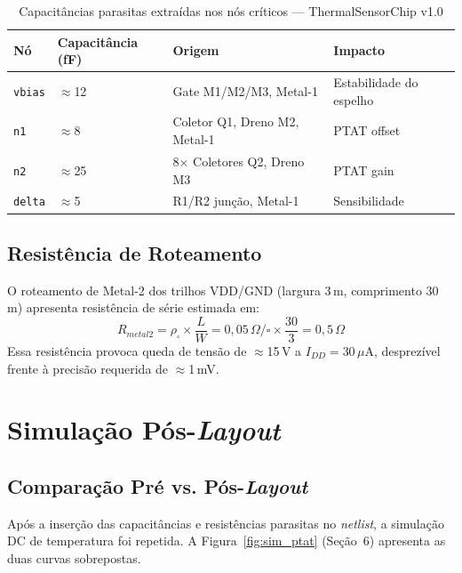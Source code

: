 \documentclass[12pt,a4paper]{article}
\begin{document}
\begin{table}[h!]
\centering
\caption{Capacitâncias parasitas extraídas nos nós críticos --- ThermalSensorChip v1.0}
\label{tab:parasitas}
\begin{tabular}{llll}
\toprule
\textbf{Nó} & \textbf{Capacitância (fF)} & \textbf{Origem} & \textbf{Impacto} \\
\midrule
\texttt{vbias} & $\approx$12 & Gate M1/M2/M3, Metal-1 & Estabilidade do espelho \\
\texttt{n1}    & $\approx$8  & Coletor Q1, Dreno M2, Metal-1 & PTAT offset \\
\texttt{n2}    & $\approx$25 & 8$\times$ Coletores Q2, Dreno M3 & PTAT gain \\
\texttt{delta} & $\approx$5  & R1/R2 junção, Metal-1 & Sensibilidade \\
\bottomrule
\end{tabular}
\end{table}

\subsection{Resistência de Roteamento}

O roteamento de Metal-2 dos trilhos VDD/GND (largura 3\,\textmu m, comprimento 30\,\textmu m)
apresenta resistência de série estimada em:
\begin{equation}
  R_{metal2} = \rho_\square \times \frac{L}{W}
    = 0{,}05\,\Omega/\square \times \frac{30}{3}
    = 0{,}5\,\Omega
\end{equation}
Essa resistência provoca queda de tensão de $\approx$15\,\textmu V a $I_{DD} = 30\,\mu$A,
desprezível frente à precisão requerida de $\approx$1\,mV.

\section{Simulação Pós-\textit{Layout}}

\subsection{Comparação Pré vs. Pós-\textit{Layout}}

Após a inserção das capacitâncias e resistências parasitas no \textit{netlist}, a simulação
DC de temperatura foi repetida. A Figura~\ref{fig:sim_ptat} (Seção~6) apresenta as duas
curvas sobrepostas.
\end{document}
